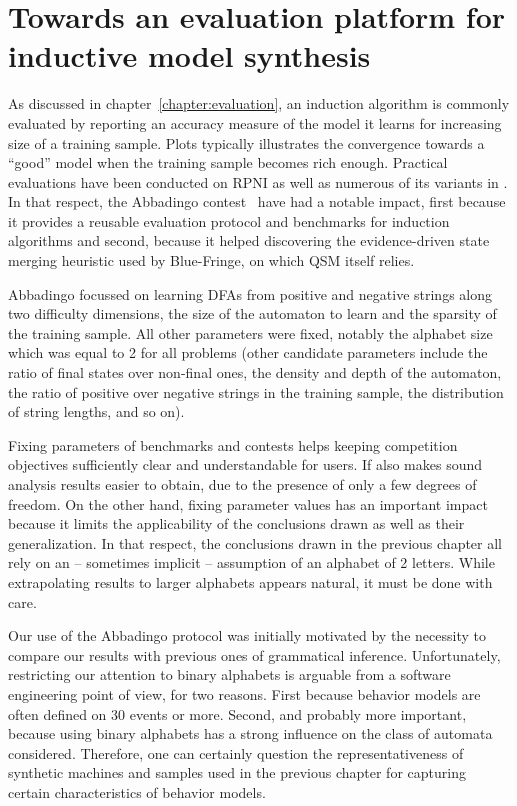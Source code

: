 \chapter{Towards an evaluation platform for inductive model synthesis\label{chapter:stamina}}

As discussed in chapter~\ref{chapter:evaluation}, an induction algorithm is commonly evaluated by reporting an accuracy measure of the model it learns for increasing size of a training sample. Plots typically illustrates the convergence towards a ``good'' model when the training sample becomes rich enough. Practical evaluations have been conducted on RPNI as well as numerous of its variants in \cite{Lang98,Damas06,Dupont08,Lambeau08}. In that respect, the Abbadingo contest~\cite{Lang98} have had a notable impact, first because it provides a reusable evaluation protocol and benchmarks for induction algorithms and second, because it helped discovering the evidence-driven state merging heuristic used by Blue-Fringe, on which QSM itself relies. 

Abbadingo focussed on learning DFAs from positive and negative strings along two difficulty dimensions, the size of the automaton to learn and the sparsity of the training sample. All other parameters were fixed, notably the alphabet size which was equal to 2 for all problems (other candidate parameters include the ratio of final states over non-final ones, the density and depth of the automaton, the ratio of positive over negative strings in the training sample, the distribution of string lengths, and so on).

Fixing parameters of benchmarks and contests helps keeping competition objectives sufficiently clear and understandable for users. If also makes sound analysis results easier to obtain, due to the presence of only a few degrees of freedom. On the other hand, fixing parameter values has an important impact because it limits the applicability of the conclusions drawn as well as their generalization. In that respect, the conclusions drawn in the previous chapter all rely on an -- sometimes implicit -- assumption of an alphabet of 2 letters. While extrapolating results to larger alphabets appears natural, it must be done with care.

Our use of the Abbadingo protocol was initially motivated by the necessity to compare our results with previous ones of grammatical inference. Unfortunately, restricting our attention to binary alphabets is arguable from a software engineering point of view, for two reasons. First because behavior models are often defined on 30 events or more. Second, and probably more important, because using binary alphabets has a strong influence on the class of automata considered. Therefore, one can certainly question the representativeness of synthetic machines and samples used in the previous chapter for capturing certain characteristics of behavior models. 

